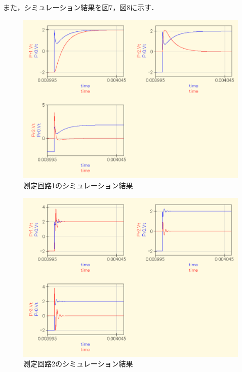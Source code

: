 \newpage

また，シミュレーション結果を図7，図8に示す．
\begin{figure}[H]
    \begin{center}
        \includegraphics[keepaspectratio, scale=0.45]{result1.pdf}
        \caption{測定回路1のシミュレーション結果}
    \end{center}
\end{figure}

\begin{figure}[H]
    \begin{center}
        \includegraphics[keepaspectratio, scale=0.45]{result2.pdf}
        \caption{測定回路2のシミュレーション結果}
    \end{center}
\end{figure}

